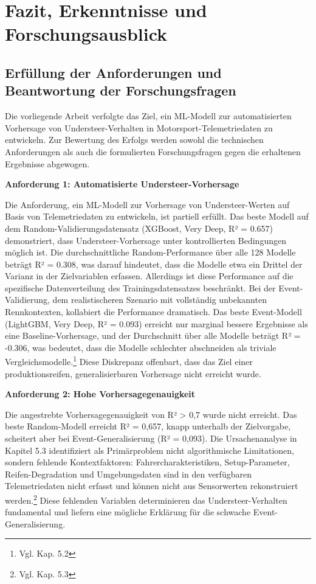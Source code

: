 \chapter{Fazit, Erkenntnisse und Forschungsausblick}

\section{Erfüllung der Anforderungen und Beantwortung der Forschungsfragen}

Die vorliegende Arbeit verfolgte das Ziel, ein \ac{ML}-Modell zur automatisierten Vorhersage von Understeer-Verhalten in Motorsport-Telemetriedaten zu entwickeln. Zur Bewertung des Erfolgs werden sowohl die technischen Anforderungen als auch die formulierten Forschungsfragen gegen die erhaltenen Ergebnisse abgewogen.

\textbf{Anforderung 1: Automatisierte Understeer-Vorhersage}

Die Anforderung, ein \ac{ML}-Modell zur Vorhersage von Understeer-Werten auf Basis von Telemetriedaten zu entwickeln, ist partiell erfüllt. Das beste Modell auf dem Random-Validierungsdatensatz (XGBoost, Very Deep, R² = 0.657) demonstriert, dass Understeer-Vorhersage unter kontrollierten Bedingungen möglich ist. Die durchschnittliche Random-Performance über alle 128 Modelle beträgt R² = 0.308, was darauf hindeutet, dass die Modelle etwa ein Drittel der Varianz in der Zielvariablen erfassen. Allerdings ist diese Performance auf die spezifische Datenverteilung des Trainingsdatensatzes beschränkt. Bei der Event-Validierung, dem realistischeren Szenario mit vollständig unbekannten Rennkontexten, kollabiert die Performance dramatisch. Das beste Event-Modell (LightGBM, Very Deep, R² = 0.093) erreicht nur marginal bessere Ergebnisse als eine Baseline-Vorhersage, und der Durchschnitt über alle Modelle beträgt R² = -0.306, was bedeutet, dass die Modelle schlechter abschneiden als triviale Vergleichsmodelle.\footnote{Vgl. Kap. 5.2} Diese Diskrepanz offenbart, dass das Ziel einer produktionsreifen, generalisierbaren Vorhersage nicht erreicht wurde.

\textbf{Anforderung 2: Hohe Vorhersagegenauigkeit}

Die angestrebte Vorhersagegenauigkeit von R² > 0,7 wurde nicht erreicht. Das beste Random-Modell erreicht R² = 0,657, knapp unterhalb der Zielvorgabe, scheitert aber bei Event-Generalisierung (R² = 0,093). Die Ursachenanalyse in Kapitel 5.3 identifiziert als Primärproblem nicht algorithmische Limitationen, sondern fehlende Kontextfaktoren: Fahrercharakteristiken, Setup-Parameter, Reifen-Degradation und Umgebungsdaten sind in den verfügbaren Telemetriedaten nicht erfasst und können nicht aus Sensorwerten rekonstruiert werden.\footnote{Vgl. Kap. 5.3} Diese fehlenden Variablen determinieren das Understeer-Verhalten fundamental und liefern eine mögliche Erklärung für die schwache Event-Generalisierung.



